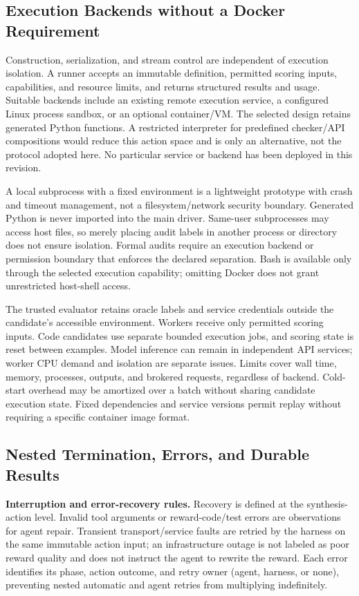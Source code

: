 \subsection{Execution Backends without a Docker Requirement}
\label{apd:harness_isolation}

Construction, serialization, and stream control are independent of execution isolation. A runner accepts an immutable definition, permitted scoring inputs, capabilities, and resource limits, and returns structured results and usage. Suitable backends include an existing remote execution service, a configured Linux process sandbox, or an optional container/VM. The selected design retains generated Python functions. A restricted interpreter for predefined checker/API compositions would reduce this action space and is only an alternative, not the protocol adopted here. No particular service or backend has been deployed in this revision.

A local subprocess with a fixed environment is a lightweight prototype with crash and timeout management, not a filesystem/network security boundary. Generated Python is never imported into the main driver. Same-user subprocesses may access host files, so merely placing audit labels in another process or directory does not ensure isolation. Formal audits require an execution backend or permission boundary that enforces the declared separation. Bash is available only through the selected execution capability; omitting Docker does not grant unrestricted host-shell access.

The trusted evaluator retains oracle labels and service credentials outside the candidate's accessible environment. Workers receive only permitted scoring inputs. Code candidates use separate bounded execution jobs, and scoring state is reset between examples. Model inference can remain in independent API services; worker CPU demand and isolation are separate issues. Limits cover wall time, memory, processes, outputs, and brokered requests, regardless of backend. Cold-start overhead may be amortized over a batch without sharing candidate execution state. Fixed dependencies and service versions permit replay without requiring a specific container image format.

\subsection{Nested Termination, Errors, and Durable Results}
\label{apd:harness_termination}

\noindent\textbf{Interruption and error-recovery rules.} Recovery is defined at the synthesis-action level. Invalid tool arguments or reward-code/test errors are observations for agent repair. Transient transport/service faults are retried by the harness on the same immutable action input; an infrastructure outage is not labeled as poor reward quality and does not instruct the agent to rewrite the reward. Each error identifies its phase, action outcome, and retry owner (agent, harness, or none), preventing nested automatic and agent retries from multiplying indefinitely.

